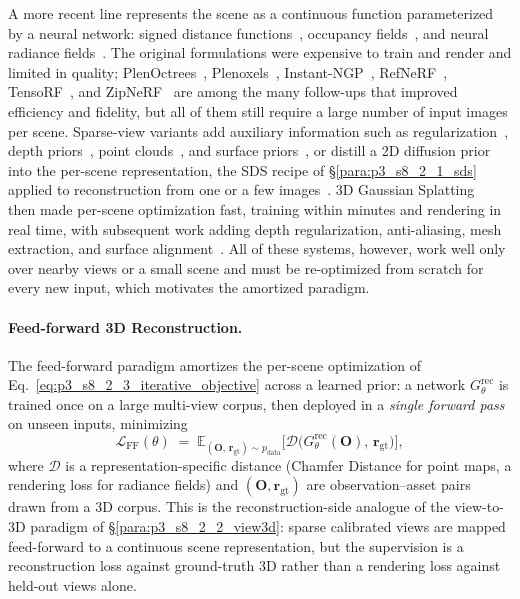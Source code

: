 A more recent line represents the scene as a continuous function parameterized by a neural network: signed distance functions~\cite{park2019deepsdf, chibane2020neural, wang2021neus, yu2022monosdf}, occupancy fields~\cite{mescheder2019occupancy, peng2020convolutional}, and neural radiance fields~\cite{mildenhall2021nerf, barron2021mip, wang2021nerf, barron2022mip}.
The original formulations were expensive to train and render and limited in quality; PlenOctrees~\cite{yu2021plenoctrees}, Plenoxels~\cite{fridovich2022plenoxels}, Instant-NGP~\cite{muller2022instant}, RefNeRF~\cite{verbin2022ref}, TensoRF~\cite{chen2022tensorf}, and ZipNeRF~\cite{barron2023zip} are among the many follow-ups that improved efficiency and fidelity, but all of them still require a large number of input images per scene.
Sparse-view variants add auxiliary information such as regularization~\cite{niemeyer2022regnerf}, depth priors~\cite{roessle2022dense, deng2022depth}, point clouds~\cite{xu2022point}, and surface priors~\cite{oechsle2021unisurf}, or distill a 2D diffusion prior into the per-scene representation, the SDS recipe of §\ref{para:p3_s8_2_1_sds} applied to reconstruction from one or a few images~\cite{melas2023realfusion, metzer2023latent, tang2023make}.
3D Gaussian Splatting~\cite{kerbl20233d} then made per-scene optimization fast, training within minutes and rendering in real time, with subsequent work adding depth regularization, anti-aliasing, mesh extraction, and surface alignment~\cite{chung2024depth, yu2024mip, huang20242d, guedon2024sugar}.
All of these systems, however, work well only over nearby views or a small scene and must be re-optimized from scratch for every new input, which motivates the amortized paradigm.

\paragraph{Feed-forward 3D Reconstruction.}
\label{para:p3_s8_2_3_feedforward}
The feed-forward paradigm amortizes the per-scene optimization of Eq.~\eqref{eq:p3_s8_2_3_iterative_objective} across a learned prior: a network $G_\theta^{\text{rec}}$ is trained once on a large multi-view corpus, then deployed in a \emph{single forward pass} on unseen inputs, minimizing
\begin{equation}
\mathcal{L}_{\text{FF}}(\theta)
\;=\;
\mathbb{E}_{(\mathbf{O},\,\mathbf{r}_{\text{gt}})\sim p_{\text{data}}}\Big[\mathcal{D}\big(G_\theta^{\text{rec}}(\mathbf{O}),\,\mathbf{r}_{\text{gt}}\big)\Big],
\label{eq:p3_s8_2_3_feedforward_objective}
\end{equation}
where $\mathcal{D}$ is a representation-specific distance (Chamfer Distance for point maps, a rendering loss for radiance fields) and $(\mathbf{O},\mathbf{r}_{\text{gt}})$ are observation--asset pairs drawn from a 3D corpus.
This is the reconstruction-side analogue of the view-to-3D paradigm of §\ref{para:p3_s8_2_2_view3d}: sparse calibrated views are mapped feed-forward to a continuous scene representation, but the supervision is a reconstruction loss against ground-truth 3D rather than a rendering loss against held-out views alone.

